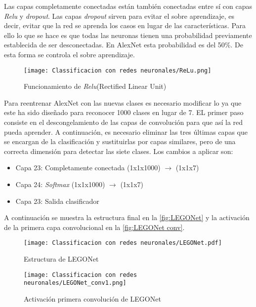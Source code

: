 Las capas completamente conectadas están también conectadas entre sí con capas \textit{Relu} y \textit{dropout}. Las capas \textit{dropout} sirven para evitar el sobre aprendizaje, es decir, evitar que la red se aprenda los casos en lugar de las características. Para ello lo que se hace es que todas las neuronas tienen una probabilidad previamente establecida de ser desconectadas. En AlexNet esta probabilidad es del 50\%. De esta forma se controla el sobre aprendizaje.


\begin{figure}[ht]  %
	\centering
	\texttt{[image: Classificacion con redes neuronales/ReLu.png]}
	\caption{Funcionamiento de \textit{Relu}(Rectified Linear Unit)}
	\label{fig:ReLu}
	\vspace{-5pt}
\end{figure}


Para reentrenar AlexNet con las nuevas clases es necesario modificar lo ya que este ha sido diseñado para reconocer 1000 clases en lugar de 7. EL primer paso consiste en el descongelamiento de las capas de convolución para que así la red pueda aprender. A continuación, es necesario eliminar las tres últimas capas que se encargan de la clasificación y sustituirlas por capas similares, pero de una correcta dimensión para detectar las siete clases. Los cambios a aplicar son:
\begin{itemize}
\item Capa 23: Completamente conectada (1x1x1000) $\rightarrow$ (1x1x7)
\item Capa 24: \textit{Softmax} (1x1x1000) $\rightarrow$ (1x1x7)
\item Capa 23: Salida clasificador
\end{itemize}

A continuación se muestra la estructura final en la \autoref{fig:LEGONet} y la activación de la primera capa convolucional en la \autoref{fig:LEGONet conv}.
	
\begin{figure}[ht]  %
	\centering
	\texttt{[image: Classificacion con redes neuronales/LEGONet.pdf]}
	\caption{Estructura de LEGONet}
	\label{fig:LEGONet}
\end{figure}

\begin{figure}[ht]  %
	\centering
	\texttt{[image: Classificacion con redes neuronales/LEGONet\_conv1.png]}
	\caption{Activación primera convolución de LEGONet}
	\label{fig:LEGONet conv}
\end{figure}


